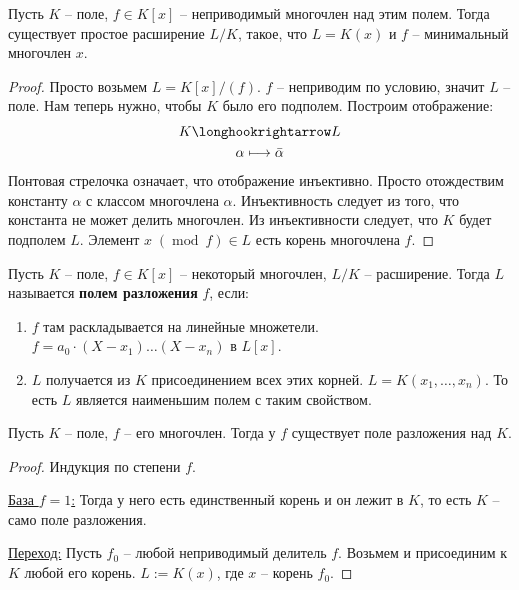 
\begin{theorem}
    Пусть $K$ -- поле, $f \in K[x]$ -- неприводимый многочлен над этим полем. Тогда существует простое расширение $L/K$, 
    такое, что $L = K(x)$ и $f$ -- минимальный многочлен $x$. 
\end{theorem}
\begin{proof}
    Просто возьмем $L = K[x]/(f)$. $f$ -- неприводим по условию, значит $L$ -- поле. Нам теперь нужно, чтобы $K$ было его подполем. 
    Построим отображение:
    \begin{gather*}
        K \longhookrightarrow L \\
        \alpha \longmapsto \bar{\alpha}
    \end{gather*} 
    Понтовая стрелочка означает, что отображение инъективно. Просто отождествим константу $\alpha$ с классом многочлена $\alpha$. Инъективность 
    следует из того, что константа не может делить многочлен. Из инъективности следует, что $K$ будет подполем $L$. Элемент $x \; (\operatorname{mod} \ f) \in L$  
    есть корень многочлена $f$. 
\end{proof}
\begin{conj}
    Пусть $K$ -- поле, $f \in K[x]$ -- некоторый многочлен, $L/K$ -- расширение. Тогда $L$ называется \textbf{полем разложения} $f$, если:
    \begin{enumerate}
        \item $f$ там раскладывается на линейные множетели. $f = a_0 \cdot (X - x_1) \dots (X - x_n)$ в $L[x]$. 
        \item $L$ получается из $K$ присоединением всех этих корней. $L = K(x_1, \dots, x_n)$. То есть $L$ является наименьшим полем с таким свойством. 
    \end{enumerate}
\end{conj}
\begin{theorem}
    Пусть $K$ -- поле, $f$ -- его многочлен. Тогда у $f$ существует поле разложения над $K$. 
\end{theorem}
\begin{proof}
    Индукция по степени $f$. 

    \quad \underline{База $f = 1$:} Тогда у него есть единственный корень и он лежит в $K$, то есть $K$ -- само поле разложения. 

    \quad \underline{Переход:} Пусть $f_0$ -- любой неприводимый делитель $f$. Возьмем и присоединим к $K$ любой его корень. $L := K(x)$, где $x$ -- корень $f_0$.  
\end{proof}
